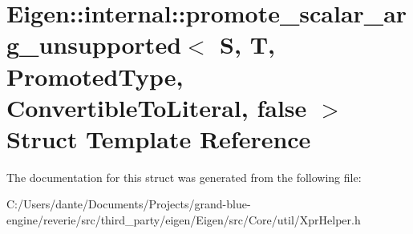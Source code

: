 \hypertarget{struct_eigen_1_1internal_1_1promote__scalar__arg__unsupported_3_01_s_00_01_t_00_01_promoted_type917020263f1acda837ffc1763f00e3e6}{}\section{Eigen\+::internal\+::promote\+\_\+scalar\+\_\+arg\+\_\+unsupported$<$ S, T, Promoted\+Type, Convertible\+To\+Literal, false $>$ Struct Template Reference}
\label{struct_eigen_1_1internal_1_1promote__scalar__arg__unsupported_3_01_s_00_01_t_00_01_promoted_type917020263f1acda837ffc1763f00e3e6}


The documentation for this struct was generated from the following file\+:\begin{DoxyCompactItemize}
\item 
C\+:/\+Users/dante/\+Documents/\+Projects/grand-\/blue-\/engine/reverie/src/third\+\_\+party/eigen/\+Eigen/src/\+Core/util/Xpr\+Helper.\+h\end{DoxyCompactItemize}
